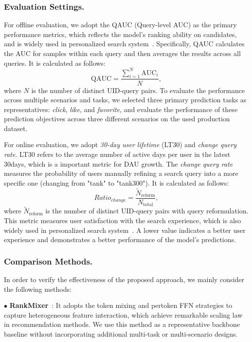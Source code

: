 \subsubsection{Evaluation Settings.}
\label{subsec-evluation}
For offline evaluation, we adopt the QAUC (Query-level AUC) as the primary performance metrics, which reflects the model's ranking ability on candidates, and is widely used in personalized search system~\cite{cotrain,hyformer}.
Specifically, QAUC calculates the AUC for samples within each query and then averages the results across all queries.
It is calculated as follows:
\begin{equation}
\label{eq:qauc}
    \text{QAUC} = \frac{\sum_{i=1}^{{N}} \text{AUC}_{i}}{{N}},
\end{equation}
where $N$ is the number of distinct UID-query pairs.
To evaluate the performance across multiple scenarios and tasks, we selected three primary prediction tasks as representatives: \emph{click}, \emph{like}, and \emph{favorite}, and evaluate the performance of these prediction objectives across three different scenarios on the used production dataset.

For online evaluation, we adopt \emph{30-day user lifetime} (\ie LT30) and \emph{change query rate}.
LT30 refers to the average number of active days per user in the latest 30days, which is a important metric for DAU growth.
The \emph{change query rate} measures the probability of users manually refining a search query into a more specific one (\eg changing from "tank" to "tank300"). It is calculated as follows:
\begin{equation}
\label{eq:changeq}
    Ratio_{change} = \frac{{\tilde{N}}_\text{reform}}{{N}_\text{total}},
\end{equation}
where $\tilde{{N}}_\text{reform}$ is the number of distinct UID-query pairs with query reformulation.
This metric measures user satisfaction with the search experience, which is also widely used in personalized search system~\cite{cotrain,hyformer}.
A lower value indicates a better user experience and demonstrates a better performance of the model's predictions.

\subsubsection{Comparison Methods.}
In order to verify the effectiveness of the proposed approach, we mainly consider the following methods:

$\bullet$ \textbf{RankMixer}~\cite{RankMixer}: It adopts the token mixing and pertoken FFN strategies to capture heterogeneous feature interaction, which achieve remarkable scaling law in recommendation methods.
We use this method as a representative backbone baseline without incorporating additional multi-task or multi-scenario designs.


